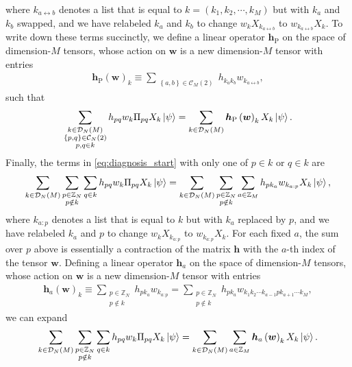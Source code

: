 \documentclass[nofootinbib,notitlepage,11pt]{revtex4-2}
\renewcommand{\t}{\text} %
\newcommand{\p}[1]{\left(#1\right)} %
\renewcommand{\set}[1]{\left\{#1\right\}} %
\newcommand{\m}{\bm} %
\newcommand{\1}{\mathds{1}}
\newcommand{\C}{\mathcal{C}}
\newcommand{\D}{\mathcal{D}}
\newcommand{\ZZ}{\mathbb{Z}}
\newcommand{\lra}{\leftrightarrow}
\begin{document}
where $k_{a\lra b}$ denotes a list that is equal to
$k=\p{k_1,k_2,\cdots,k_M}$ but with $k_a$ and $k_b$ swapped, and we
have relabeled $k_a$ and $k_b$ to change $w_k X_{k_{a\lra b}}$ to
$w_{k_{a\lra b}} X_k$.  To write down these terms succinctly, we
define a linear operator $\m h_{\t{P}}$ on the space of dimension-$M$
tensors, whose action on $\m w$ is a new dimension-$M$ tensor with
entries
\begin{align}
  \m h_{\t{P}}\p{\m w}_k
  \equiv \sum_{\substack{\set{a,b}\in\C_M\p{2}}}
  h_{k_ak_b} w_{k_{a\lra b}},
  \label{eq:multi_body_op_perm}
\end{align}
such that
\begin{align}
  \sum_{\substack{k\in\D_N\p{M}\\\set{p,q}\in\C_N\p{2}\\p,q\in k}}
  h_{pq} w_k \Pi_{pq} X_k \ket\psi
  = \sum_{k\in\D_N\p{M}} \m h_{\t{P}}\p{\m w}_k X_k \ket\psi.
\end{align}
Finally, the terms in \eqref{eq:diagnosis_start} with only one of
$p\in k$ or $q\in k$ are
\begin{align}
  \sum_{k\in\D_N\p{M}} \sum_{\substack{p\in\ZZ_N\\p\notin k}}
  \sum_{q\in k} h_{pq} w_k  \Pi_{pq} X_k \ket\psi
  = \sum_{k\in\D_N\p{M}} \sum_{\substack{p\in\ZZ_N\\p\notin k}}
  \sum_{a\in\ZZ_M} h_{pk_a} w_{k_{a:p}} X_k \ket\psi,
\end{align}
where $k_{a:p}$ denotes a list that is equal to $k$ but with $k_a$
replaced by $p$, and we have relabeled $k_a$ and $p$ to change
$w_k X_{k_{a:p}}$ to $w_{k_{a:p}} X_k$.  For each fixed $a$, the sum
over $p$ above is essentially a contraction of the matrix $\m h$ with
the $a$-th index of the tensor $\m w$.  Defining a linear operator
$\m h_a$ on the space of dimension-$M$ tensors, whose action on $\m w$
is a new dimension-$M$ tensor with entries
\begin{align}
  \m h_a\p{\m w}_k
  \equiv \sum_{\substack{p\in\ZZ_N\\p\notin k}} h_{pk_a} w_{k_{a:p}}
  = \sum_{\substack{p\in\ZZ_N\\p\notin k}}
  h_{pk_a} w_{k_1 k_2 \cdots k_{a-1} p k_{a+1} \cdots k_M},
  \label{eq:multi_body_op_contract}
\end{align}
we can expand
\begin{align}
  \sum_{k\in\D_N\p{M}} \sum_{\substack{p\in\ZZ_N\\p\notin k}}
  \sum_{q\in k} h_{pq} w_k  \Pi_{pq} X_k \ket\psi
  = \sum_{k\in\D_N\p{M}} \sum_{a\in\ZZ_M}
  \m h_a\p{\m w}_k X_k \ket\psi.
\end{align}
\end{document}
